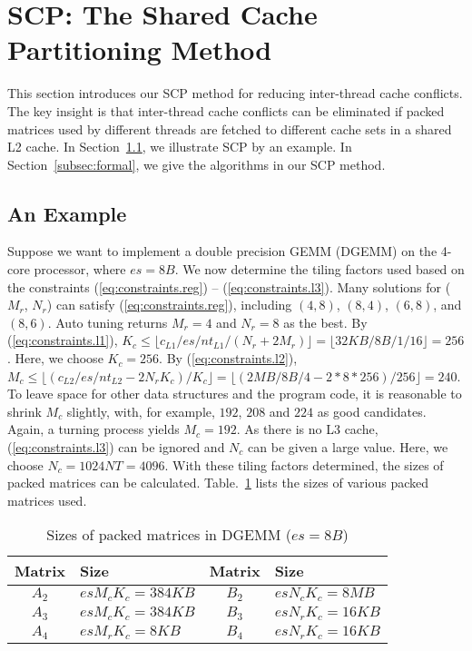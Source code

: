 \section{SCP: The Shared Cache Partitioning Method}\label{sec:scp}

This section introduces our SCP method for reducing
inter-thread cache conflicts.
The key insight is that inter-thread cache conflicts can be eliminated
if packed matrices used by different threads are fetched to different cache sets in a shared L2 cache.
In Section~\ref{subsec:example}, we illustrate 
SCP by an example.  In Section~\ref{subsec:formal},
we give the algorithms in our SCP method.

\subsection{An Example}\label{subsec:example}


Suppose we want to implement a double precision GEMM (DGEMM) on
the 4-core processor, where $es=8B$.
We now determine the tiling factors used based on
the constraints (\ref{eq:constraints.reg}) -- (\ref{eq:constraints.l3}).
Many solutions for ($M_r$, $N_r$) can satisfy (\ref{eq:constraints.reg}), including
$(4,8)$, $(8,4)$, $(6,8)$, and $(8,6)$.
Auto tuning returns $M_r = 4$ and $N_r = 8$ as the best.
By (\ref{eq:constraints.l1}),
$K_c \le \lfloor c_{L1}/es/nt_{L1}/(N_r + 2 M_r) \rfloor = \lfloor 32KB/8B/1/16 \rfloor = 256$.
Here, we choose $K_c=256$.
By (\ref{eq:constraints.l2}),
$M_c \le \lfloor (c_{L2}/es/nt_{L2} - 2 N_r K_c )/ K_c \rfloor =
\lfloor (2MB/8B/4 - 2*8*256)/256 \rfloor = 240$.
To leave space for other data structures and the program code,
it is reasonable to shrink $M_c$ slightly, with,
for example, $192$, $208$ and $224$ as good
candidates. Again, a turning process yields
$M_c = 192$.
As there is no L3 cache, (\ref{eq:constraints.l3}) can be ignored
and $N_c$ can be given a large value.
Here, we choose $N_c = 1024NT = 4096$.
With these tiling factors determined, the sizes of packed matrices
can be calculated. Table.~\ref{tab:msizes} lists
the sizes of various packed matrices used.

\begin{table}
  \centering
  \caption{Sizes of packed matrices in DGEMM ($es = 8B$)}
  \label{tab:msizes}
  \begin{tabular}{cl|cl}
    \toprule
    Matrix & Size & Matrix & Size \\
    \midrule
    $A_2$ & $es M_c K_c = 384KB$ & $B_2$ & $es N_c K_c = 8MB$ \\
    $A_3$ & $es M_c K_c = 384KB$ & $B_3$ & $es N_r K_c = 16KB$ \\
    $A_4$ & $es M_r K_c = 8KB$   & $B_4$ & $es N_r K_c = 16KB$ \\
    \bottomrule
  \end{tabular}
\end{table}

